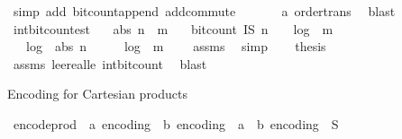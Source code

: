 \begin{isabellebody}
\ {\isacharparenleft}{\kern0pt}simp\ add{\isacharcolon}{\kern0pt}\ bit{\isacharunderscore}{\kern0pt}count{\isacharunderscore}{\kern0pt}append\ add{\isachardot}{\kern0pt}commute{\isacharparenright}{\kern0pt}\isanewline
\ \ \ \ \ \isamarkupfalse%
\ a\ order{\isacharunderscore}{\kern0pt}trans\ \isamarkupfalse%
\ blast\isanewline
{}\isamarkupfalse%
%
\endisatagproof
{\isafoldproof}%
%
\isadelimproof
\isanewline
%
\endisadelimproof
\isanewline
{}\isamarkupfalse%
\ int{\isacharunderscore}{\kern0pt}bit{\isacharunderscore}{\kern0pt}count{\isacharunderscore}{\kern0pt}est{\isacharcolon}{\kern0pt}\isanewline
\ \ \ {\isachardoublequoteopen}abs\ n\ {\isasymle}\ m{\isachardoublequoteclose}\isanewline
\ \ \ {\isachardoublequoteopen}bit{\isacharunderscore}{\kern0pt}count\ {\isacharparenleft}{\kern0pt}I\isactrlsub S\ n{\isacharparenright}{\kern0pt}\ {\isasymle}\ {}\ {\isacharasterisk}{\kern0pt}\ log\ {}\ {\isacharparenleft}{\kern0pt}m{\isacharplus}{\kern0pt}{}{\isacharparenright}{\kern0pt}\ {\isacharplus}{\kern0pt}\ {}{\isachardoublequoteclose}\isanewline
%
\isadelimproof
%
\endisadelimproof
%
\isatagproof
{}\isamarkupfalse%
\ {\isacharminus}{\kern0pt}\isanewline
\ \ \isamarkupfalse%
\ {\isachardoublequoteopen}{}\ {\isacharasterisk}{\kern0pt}\ log\ {}\ {\isacharparenleft}{\kern0pt}abs\ n{\isacharplus}{\kern0pt}{}{\isacharparenright}{\kern0pt}\ {\isacharplus}{\kern0pt}\ {}\ {\isasymle}\ {}\ {\isacharasterisk}{\kern0pt}\ log\ {}\ {\isacharparenleft}{\kern0pt}m{\isacharplus}{\kern0pt}{}{\isacharparenright}{\kern0pt}\ {\isacharplus}{\kern0pt}\ {}{\isachardoublequoteclose}\ \isamarkupfalse%
\ assms\ \isamarkupfalse%
\ simp\isanewline
\ \ \isamarkupfalse%
\ {\isacharquery}{\kern0pt}thesis\ \isamarkupfalse%
\ assms\ le{\isacharunderscore}{\kern0pt}ereal{\isacharunderscore}{\kern0pt}le\ int{\isacharunderscore}{\kern0pt}bit{\isacharunderscore}{\kern0pt}count\ \isamarkupfalse%
\ blast\isanewline
{}\isamarkupfalse%
%
\endisatagproof
{\isafoldproof}%
%
\isadelimproof
%
\endisadelimproof
%
\begin{isamarkuptext}%
Encoding for Cartesian products%
\end{isamarkuptext}\isamarkuptrue%
\isamarkupfalse%
\ encode{\isacharunderscore}{\kern0pt}prod\ {\isacharcolon}{\kern0pt}{\isacharcolon}{\kern0pt}\ {\isachardoublequoteopen}{\isacharprime}{\kern0pt}a\ encoding\ {\isasymRightarrow}\ {\isacharprime}{\kern0pt}b\ encoding\ {\isasymRightarrow}\ {\isacharparenleft}{\kern0pt}{\isacharprime}{\kern0pt}a\ {\isasymtimes}\ {\isacharprime}{\kern0pt}b{\isacharparenright}{\kern0pt}\ encoding{\isachardoublequoteclose}\ {\isacharparenleft}{\kern0pt}\ {\isachardoublequoteopen}{\isasymtimes}\isactrlsub S{\isachardoublequoteclose}\ {}{}{\isacharparenright}{\kern0pt}\isanewline

\end{isabellebody}

